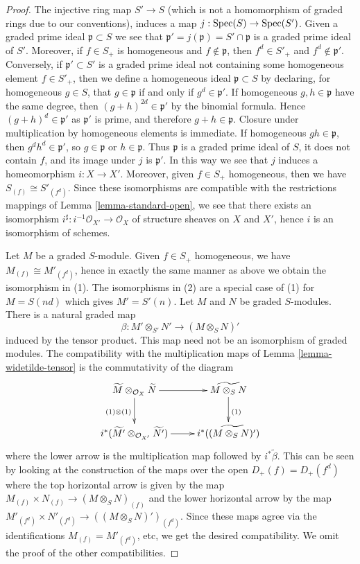 \begin{proof}
The injective ring map $S' \to S$ (which is not a homomorphism of graded rings
due to our conventions), induces a map $j : \mathop{\mathrm{Spec}}(S) \to \mathop{\mathrm{Spec}}(S')$.
Given a graded prime ideal $\mathfrak p \subset S$ we see that
$\mathfrak p' = j(\mathfrak p) = S' \cap \mathfrak p$
is a graded prime ideal of $S'$.
Moreover, if $f \in S_+$ is homogeneous and $f \not \in \mathfrak p$, then
$f^d \in S'_+$ and $f^d \not \in \mathfrak p'$. Conversely, if
$\mathfrak p' \subset S'$ is a graded prime ideal not containing some
homogeneous element $f \in S'_+$, then
we define a homogeneous ideal $\mathfrak p\subset S$ by declaring, for
homogeneous $g\in S$, that $g\in\mathfrak p$ if and only if
$g^d\in\mathfrak p'$. If homogeneous $g,h\in\mathfrak p$ have the same
degree, then $(g+h)^{2d}\in\mathfrak p'$ by the binomial formula. Hence
$(g+h)^d\in\mathfrak p'$ as $\mathfrak p'$ is prime, and therefore
$g+h\in\mathfrak p$. Closure under multiplication by homogeneous elements
is immediate. If homogeneous $gh\in\mathfrak p$, then
$g^dh^d\in\mathfrak p'$, so $g\in\mathfrak p$ or $h\in\mathfrak p$.
Thus $\mathfrak p$ is a graded prime ideal of $S$, it does not contain $f$,
and its image under $j$ is $\mathfrak p'$.
In this way we see that $j$ induces a homeomorphism $i : X \to X'$.
Moreover, given $f \in S_+$ homogeneous, then we have
$S_{(f)} \cong S'_{(f^d)}$. Since these isomorphisms are compatible
with the restrictions mappings of
Lemma \ref{lemma-standard-open}, we see that there exists an
isomorphism $i^\sharp : i^{-1}\mathcal{O}_{X'} \to \mathcal{O}_X$ of
structure sheaves on $X$ and $X'$, hence $i$ is an isomorphism
of schemes.

\medskip\noindent
Let $M$ be a graded $S$-module. Given $f \in S_+$ homogeneous, we have
$M_{(f)} \cong M'_{(f^d)}$, hence in exactly the same manner as above
we obtain the isomorphism in (1). The isomorphisms in (2) are a special
case of (1) for $M = S(nd)$ which gives $M' = S'(n)$. Let $M$ and $N$
be graded $S$-modules. There is a natural graded map
$$
\beta:M'\otimes_{S'}N'\longrightarrow(M\otimes_SN)'
$$
induced by the tensor product. This map need not be an isomorphism of graded
modules. The compatibility with the multiplication maps of
Lemma \ref{lemma-widetilde-tensor} is the commutativity of the diagram
$$
\xymatrix{
\widetilde M \otimes_{\mathcal{O}_X} \widetilde N
\ar[d]_{(1) \otimes (1)} \ar[r] &
\widetilde{M \otimes_S N} \ar[d]^{(1)} \\
i^*(\widetilde{M'} \otimes_{\mathcal{O}_{X'}} \widetilde{N'}) \ar[r] &
i^*(\widetilde{(M \otimes_S N)'})
}
$$
where the lower arrow is the multiplication map followed by
$i^*\widetilde\beta$.
This can be seen by looking at the construction of the maps
over the open $D_+(f) = D_+(f^d)$ where the top horizontal
arrow is given by the map
$M_{(f)} \times N_{(f)} \to (M \otimes_S N)_{(f)}$
and the lower horizontal arrow by the map
$M'_{(f^d)} \times N'_{(f^d)} \to ((M \otimes_S N)')_{(f^d)}$.
Since these maps agree via the identifications
$M_{(f)} = M'_{(f^d)}$, etc, we get the desired compatibility.
We omit the proof of the other compatibilities.
\end{proof}
